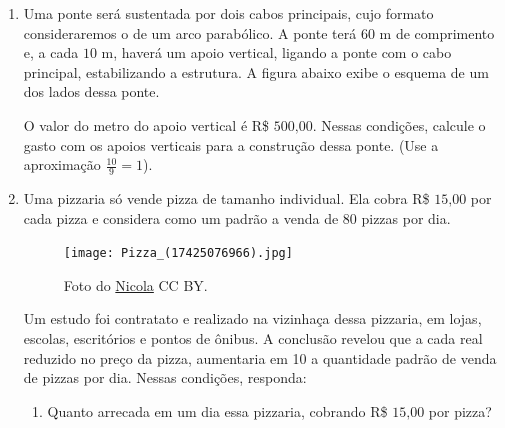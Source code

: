 \begin{enumerate}
\item Uma ponte será sustentada por dois cabos principais,  cujo formato consideraremos o de um arco parabólico. A ponte terá \(60\) m de comprimento e, a cada \(10\) m, haverá um apoio vertical, ligando a ponte com o cabo principal, estabilizando a estrutura. A figura abaixo exibe o esquema de um dos lados dessa ponte.
\begin{center}\end{center}
O valor do metro do apoio vertical é R\$ \(500\text{,}00\). Nessas condições, calcule o gasto com os apoios verticais para a construção dessa ponte. (Use a aproximação \(\frac{10}{9} = 1\)).

\item Uma pizzaria só vende pizza de tamanho individual. Ela cobra R\$ \(15\text{,}00\) por cada pizza e considera como um padrão a venda de \(80\) pizzas por dia.

\begin{figure}[H]
\centering
\capstart

\noindent\texttt{[image: Pizza\_(17425076966).jpg]}
\caption{Foto do \href{https://commons.wikimedia.org/wiki/File:Pizza\_(17425076966).jpg}{Nicola} CC BY.}\label{\detokenize{AF209-E:id4}}\end{figure}

Um estudo foi contratato e realizado na vizinhaça dessa pizzaria, em lojas, escolas, escritórios e pontos de ônibus. A conclusão revelou que a cada real reduzido no preço da pizza, aumentaria em 10 a quantidade padrão de venda de pizzas por dia. Nessas condições, responda:
\begin{enumerate}
\item {} 
Quanto arrecada em um dia essa pizzaria, cobrando R\$ \(15\text{,}00\) por pizza?


\end{enumerate}
\end{enumerate}

